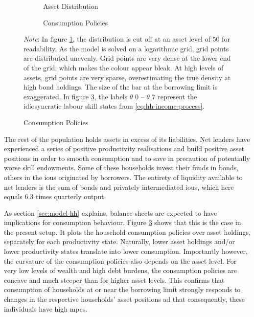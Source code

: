 \documentclass[12pt]{article} %
\numberwithin{equation}{section} %
\numberwithin{figure}{section}
\numberwithin{table}{section}
\begin{document}
\begin{figure}[t]
    \caption{The Initial Steady State}
    \label{fig:init-stst-dist-pol}
    \centering
    \begin{subfigure}[b]{0.49\textwidth}
    \caption{Asset Distribution}
    \label{fig:init-stst-dist-pol-a-dist}
         \centering
         
         \vspace{0.01cm}
     \end{subfigure}
     \hfill
     \begin{subfigure}[b]{0.49\textwidth}
     \caption{Consumption Policies}
     \label{fig:init-stst-dist-pol-c}
         \centering
         
         \vspace{0.01cm}
     \end{subfigure}
     \justifying
     \footnotesize
	\textit{Note}: In figure \ref{fig:init-stst-dist-pol-a-dist}, the distribution is cut off at an asset level of $50$ for readability. As the model is solved on a logarithmic grid, grid points are distributed unevenly. Grid points are very dense at the lower end of the grid, which makes the colour appear bleak. At high levels of assets, grid points are very sparse, overestimating the true density at high bond holdings. The size of the bar at the borrowing limit is exaggerated. In figure \ref{fig:init-stst-dist-pol-c}, the labels $\theta\_0$ -- $\theta\_7$ represent the idiosyncratic labour skill states from \eqref{eq:hh-income-process}.
\end{figure}

The rest of the population holds assets in excess of its liabilities. Net lenders have experienced a series of positive productivity realisations and build positive asset positions in order to smooth consumption and to save in precaution of potentially worse skill endowments. Some of these households invest their funds in bonds, others in the \Gls{iou}s originated by borrowers. The entirety of liquidity available to net lenders is the sum of bonds and privately intermediated \Gls{iou}s, which here equals $6.3$ times quarterly output.

As section \ref{sec:model-hh} explains, balance sheets are expected to have implications for consumption behaviour. Figure \ref{fig:init-stst-dist-pol-c} shows that this is the case in the present setup. It plots the household consumption policies over asset holdings, separately for each productivity state. Naturally, lower asset holdings and/or lower productivity states translate into lower consumption. Importantly however, the curvature of the consumption policies also depends on the asset level. For very low levels of wealth and high debt burdens, the consumption policies are concave and much steeper than for higher asset levels. This confirms that consumption of households at or near the borrowing limit strongly responds to changes in the respective households' asset positions ad that consequently, these individuals have high \Gls{mpc}s.
\end{document}
